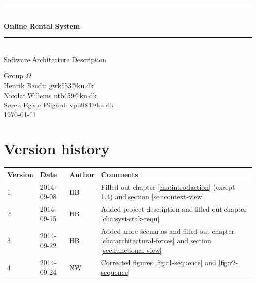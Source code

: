 \documentclass[a4paper,11pt]{report}
\makeatletter
\newcommand{\systemname}{Online Rental System}
\newcommand{\groupname}{Group $\Omega$}
\newcommand{\contactdetails}{Henrik Bendt: gwk553@ku.dk\\Nicolai Willems ntb459@ku.dk\\Søren Egede Pilgård: vpb984@ku.dk}
\makeatother
\begin{document}
%
%
\newcommand{\HRule}{\rule{\linewidth}{0.5mm}}
\begin{titlepage}

  \begin{center}

    \vspace*{4cm}
    \HRule \\[0.4cm]
    { \huge \bfseries \systemname}\\[0.4cm]
    \HRule \\[1.5cm]

    {\Large Software Architecture Description}

    \vfill
  \end{center}

  \begin{flushleft}
    {\LARGE \groupname}\\[0.2cm]
    {\large \contactdetails}\\[0.2cm]
   {\large \today}
  \end{flushleft}
\end{titlepage}

%
%
\newpage
\chapter*{Version history}

\begin{center}
  \begin{tabular}[h!]{| l | l | l | p{8 cm} |}
    \hline
    \rowcolor{gray}
    Version & Date & Author & Comments \\
    \hline
    \hline
    1 & 2014-09-08 & HB & Filled out chapter \ref{cha:introduction} (except
    1.4) and section \ref{sec:context-view}\\
    \hline
    2 & 2014-09-15 & HB & Added project description and filled out
        chapter \ref{cha:syst-stak-requ} \\
    \hline
    3 & 2014-09-22 & HB & Added more scenarios and filled out chapter
    \ref{cha:architectural-forces} and section \ref{sec:functional-view}\\
    \hline
    4 & 2014-09-24 & NW & Corrected figures \ref{fig:r1-sequence} and
    \ref{fig:r2-sequence}\\
    \hline
  \end{tabular}
\end{center}

%
%
\setcounter{tocdepth}{1}
\tableofcontents
\end{document}

